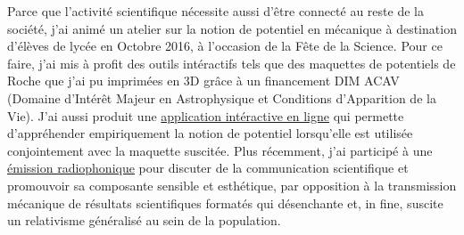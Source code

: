 \documentclass[a4paper,12pt,onecolumn]{article}
\begin{document}
\indent Parce que l'activité scientifique nécessite aussi d'être connecté au reste de la société, j'ai animé un atelier sur la notion de potentiel en mécanique à destination d'élèves de lycée en Octobre 2016, à l'occasion de la Fête de la Science. Pour ce faire, j'ai mis à profit des outils intéractifs tels que des maquettes de potentiels de Roche que j'ai pu imprimées en 3D grâce à un financement DIM ACAV (Domaine d'Intérêt Majeur en Astrophysique et Conditions d'Apparition de la Vie). J'ai aussi produit une \href{http://demonstrations.wolfram.com/TrajectoryOfATestMassInARochePotential/}{application intéractive en ligne} qui permette d'appréhender empiriquement la notion de potentiel lorsqu'elle est utilisée conjointement avec la maquette suscitée. Plus récemment, j'ai participé à une \href{https://www.mixcloud.com/faconde/faconde-s2e01-vulgarisation/}{émission radiophonique} pour discuter de la communication scientifique et promouvoir sa composante sensible et esthétique, par opposition à la transmission mécanique de résultats scientifiques formatés qui désenchante et, in fine, suscite un relativisme généralisé au sein de la population.

%
%
%
\end{document}
